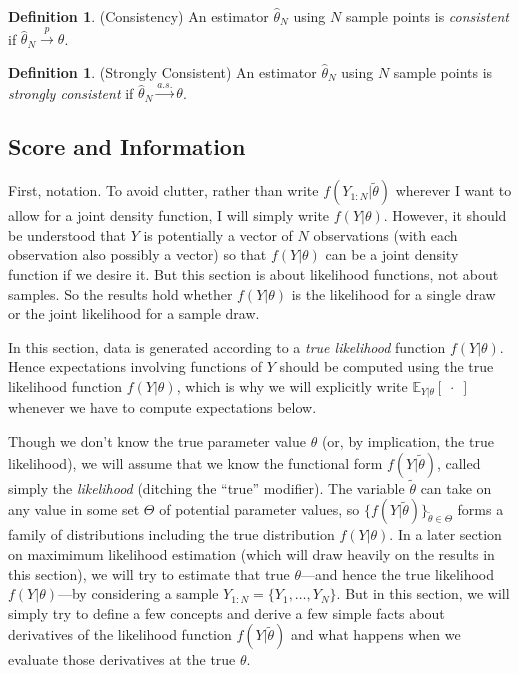 \documentclass[12pt]{article}
\theoremstyle{plain}
\theoremstyle{definition}
\newtheorem{defn}[thm]{Definition}
\theoremstyle{remark}
\newcommand{\E}{\mathbb{E}}
\newcommand{\asto}{\xrightarrow{a.s.}}
\newcommand{\pto}{\xrightarrow{p}}
\begin{document}
\begin{defn}(Consistency)
An estimator $\hat{\theta}_N$ using $N$ sample points is
\emph{consistent} if $\hat{\theta}_N\pto \theta$.
\end{defn}

\begin{defn}(Strongly Consistent)
An estimator $\hat{\theta}_N$ using $N$ sample points is
\emph{strongly consistent} if $\hat{\theta}_N\asto \theta$.
\end{defn}


\subsection{Score and Information}

First, notation. To avoid clutter, rather than write
$f(Y_{1:N}|\tilde{\theta})$ wherever I want to allow for a joint density
function, I will simply write $f(Y|\theta)$. However, it should be
understood that $Y$ is potentially a vector of $N$ observations (with
each observation also possibly a vector) so that $f(Y|\theta)$ can be a
joint density function if we desire it.  But this section is about
likelihood functions, not about samples. So the results hold whether
$f(Y|\theta)$ is the likelihood for a single draw or the joint
likelihood for a sample draw.

In this section, data is generated according to a \emph{true likelihood}
function $f(Y|\theta)$. Hence expectations involving functions of $Y$
should be computed using the true likelihood function $f(Y|\theta)$,
which is why we will explicitly write $\E_{Y|\theta}[\;\cdot\;]$
whenever we have to compute expectations below.

Though we don't know the true parameter value $\theta$ (or, by
implication, the true likelihood), we will assume that we know the
functional form $f(Y|\tilde{\theta})$, called simply the
\emph{likelihood} (ditching the ``true'' modifier).  The variable
$\tilde{\theta}$ can take on any value in some set $\Theta$ of potential
parameter values, so $\{f(Y|\tilde{\theta})\}_{\tilde{\theta}\in\Theta}$
forms a family of distributions including the true distribution
$f(Y|\theta)$.  In a later section on maximimum likelihood estimation
(which will draw heavily on the results in this section), we will try to
estimate that true $\theta$---and hence the true likelihood
$f(Y|\theta)$---by considering a sample $Y_{1:N}=\{Y_1,\ldots,Y_N\}$.
But in this section, we will simply try to define a few concepts and
derive a few simple facts about derivatives of the likelihood function
$f(Y|\tilde{\theta})$ and what happens when we evaluate those
derivatives at the true $\theta$.
\end{document}
